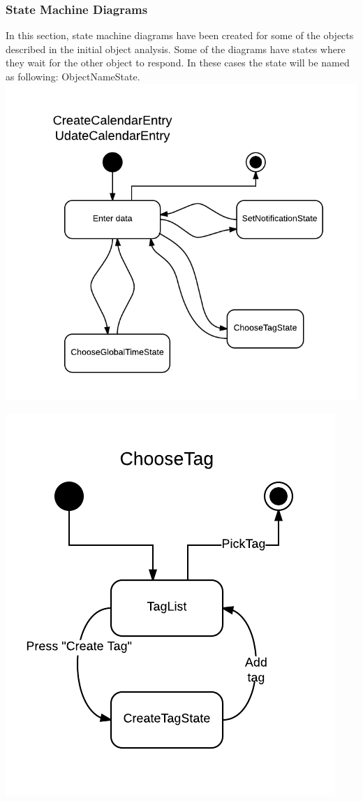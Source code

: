 \newpage
\subsubsection{State Machine Diagrams}
In this section, state machine diagrams have been created for some of the objects described in the initial object analysis. Some of the diagrams have states where they wait for the other object to respond. In these cases the state will be named as following: ObjectNameState.\\

\includegraphics[scale=0.5]{CreateUpdateEntry-StateDiagram}

\includegraphics[scale=0.6]{ChooseTag-StateDiagram}

